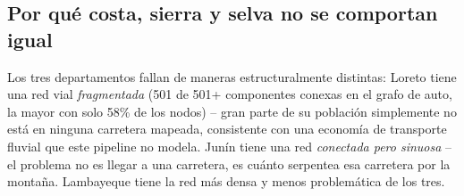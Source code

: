 \documentclass[11pt,a4paper]{article}
\begin{document}


\subsection{Por qué costa, sierra y selva no se comportan igual}
Los tres departamentos fallan de maneras estructuralmente distintas:
Loreto tiene una red vial \emph{fragmentada} (501 de 501+ componentes
conexas en el grafo de auto, la mayor con solo 58\% de los nodos) -- gran
parte de su población simplemente no está en ninguna carretera mapeada,
consistente con una economía de transporte fluvial que este pipeline no
modela. Junín tiene una red \emph{conectada pero sinuosa} -- el problema no
es llegar a una carretera, es cuánto serpentea esa carretera por la
montaña. Lambayeque tiene la red más densa y menos problemática de los
tres.
\end{document}
